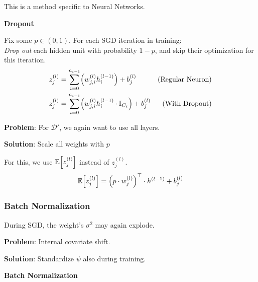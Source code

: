 This is a method specific to Neural Networks.

\method \textbf{Dropout}

Fix some $p \in (0,1)$. For each SGD iteration in training:\\
\textit{Drop out} each hidden unit with probability $1-p$, and skip their optimization for this iteration.
\begin{align*}
    z_j^{(l)} &= \sum_{i=0}^{n_{i-1}}\Bigl( w_{j,i}^{(l)}h_i^{(l-1)} \Bigr) + b_j^{(l)}                         & \text{(Regular Neuron)}       \\
    z_j^{(l)} &= \sum_{i=0}^{n_{i-1}}\Bigl( w_{j,i}^{(l)}h_i^{(l-1)} \cdot \mathbb{I}_{C_i} \Bigr) + b_j^{(l)}  & \text{(With Dropout)}
\end{align*}

\textbf{Problem}: For $\mathcal{D}'$, we again want to use all layers.

\textbf{Solution}: Scale all weights with $p$


For this, we use $\mathbb{E}\Bigl[ z_j^{(l)} \Bigr]$ instead of $z_j^{(l)}$.
\begin{align*}
    \mathbb{E}\Bigl[ z_j^{(l)} \Bigr] = \Bigl( p\cdot w_j^{(l)} \Bigr)^\top \cdot h^{(l-1)} + b_j^{(l)}
\end{align*}

\subsubsection{Batch Normalization}

During SGD, the weight's $\sigma^2$ may again explode.\\

\textbf{Problem}: Internal covariate shift.\\

\textbf{Solution}: Standardize $\psi$ also during training.

\newpage

\method \textbf{Batch Normalization}


